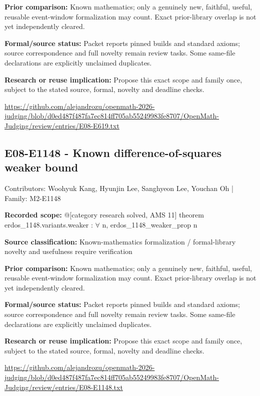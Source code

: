 \documentclass[11pt,a4paper]{article}
\begin{document}
\textbf{Prior comparison:} Known mathematics; only a genuinely new, faithful, useful, reusable event-window formalization may count. Exact prior-library overlap is not yet independently cleared.

\begin{samepage}
\textbf{Formal/source status:} Packet reports pinned builds and standard axioms; source correspondence and full novelty remain review tasks. Some same-file declarations are explicitly unclaimed duplicates.

\end{samepage}
\textbf{Research or reuse implication:} Propose this exact scope and family once, subject to the stated source, formal, novelty and deadline checks.

{\small \url{https://github.com/alejandrozu/openmath-2026-judging/blob/d0ed487f487fa7ec814ff705ab55249983fe8707/OpenMath-Judging/review/entries/E08-E619.txt}\par}

\begin{samepage}
\subsection{E08-E1148  -  Known difference-of-squares weaker bound}
{\small Contributors: Woohyuk Kang, Hyunjin Lee, Sanghyeon Lee, Youchan Oh | Family: M2-E1148\par}

\textbf{Recorded scope:} @[category research solved, AMS 11] theorem erdos\_1148.variants.weaker : \ensuremath{\forall} n, erdos\_1148\_weaker\_prop n


\end{samepage}
\textbf{Source classification:} Known-mathematics formalization / formal-library novelty and usefulness require verification

\textbf{Prior comparison:} Known mathematics; only a genuinely new, faithful, useful, reusable event-window formalization may count. Exact prior-library overlap is not yet independently cleared.

\textbf{Formal/source status:} Packet reports pinned builds and standard axioms; source correspondence and full novelty remain review tasks. Some same-file declarations are explicitly unclaimed duplicates.

\textbf{Research or reuse implication:} Propose this exact scope and family once, subject to the stated source, formal, novelty and deadline checks.

{\small \url{https://github.com/alejandrozu/openmath-2026-judging/blob/d0ed487f487fa7ec814ff705ab55249983fe8707/OpenMath-Judging/review/entries/E08-E1148.txt}\par}
\end{document}
